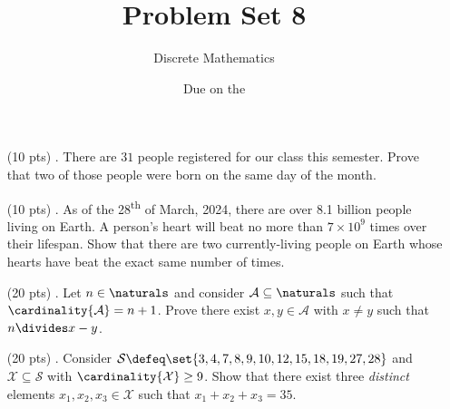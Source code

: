 

\title{Problem Set 8}
\author[Daniel Gonzalez Cedre]{Discrete Mathematics}
\date{Due on the }



\maketitle

\begin{enumerate}
  \item[(10 pts) \quad 1.]
    There are $31$ people registered for our class this semester.
    Prove that two of those people were born on the same day of the month.

  \item[(10 pts) \quad 2.]
    As of the 28\textsuperscript{th} of March, 2024, there are over 8.1 billion people living on Earth.%
    A person's heart will beat no more than $7 \times 10^9$ times over their lifespan.
    Show that there are two currently-living people on Earth whose hearts have beat the exact same number of times. 

  \item[(20 pts) \quad 3.]
    Let $n \in \naturals$ and consider $\mathcal{A} \subseteq \naturals$ such that $\cardinality{\mathcal{A}} = n + 1$.
    Prove there exist $x, y \in \mathcal{A}$ with $x \neq y$ such that $n \divides x - y$.

  \item[(20 pts) \quad 4.]
    Consider $\mathcal{S} \defeq \set{3, 4, 7, 8, 9, 10, 12, 15, 18, 19, 27, 28}$ and $\mathcal{X} \subseteq \mathcal{S}$ with $\cardinality{\mathcal{X}} \geq 9$.
    Show that there exist three \emph{distinct} elements $x_1, x_2, x_3 \in \mathcal{X}$ such that $x_1 + x_2 + x_3 = 35$.


\end{enumerate}
